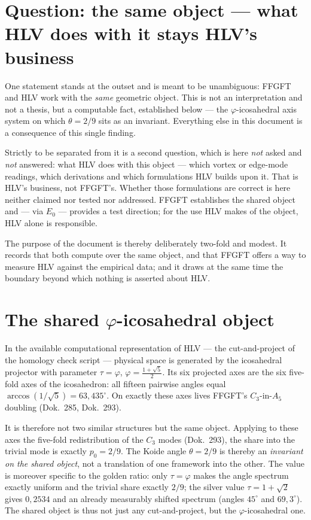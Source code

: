 \section{Question: the same object --- what HLV does with it stays HLV's business}
One statement stands at the outset and is meant to be unambiguous: FFGFT and HLV work with the
\emph{same} geometric object. This is not an interpretation and not a thesis, but a computable
fact, established below --- the $\varphi$-icosahedral axis system on which $\theta=2/9$ sits as an
invariant. Everything else in this document is a consequence of this single finding.

Strictly to be separated from it is a second question, which is here \emph{not} asked and
\emph{not} answered: what HLV does with this object --- which vortex or edge-mode readings, which
derivations and which formulations HLV builds upon it. That is HLV's business, not FFGFT's.
Whether those formulations are correct is here neither claimed nor tested nor addressed. FFGFT
establishes the shared object and --- via $E_0$ --- provides a test direction; for the use HLV
makes of the object, HLV alone is responsible.

The purpose of the document is thereby deliberately two-fold and modest. It records that both
compute over the same object, and that FFGFT offers a way to measure HLV against the empirical
data; and it draws at the same time the boundary beyond which nothing is asserted about HLV.

\section{The shared $\varphi$-icosahedral object}
In the available computational representation of HLV --- the cut-and-project of the homology
check script  --- physical space is generated by the
icosahedral projector with parameter $\tau=\varphi$, $\varphi=\tfrac{1+\sqrt5}{2}$. Its six
projected axes are the six five-fold axes of the icosahedron: all fifteen pairwise angles equal
$\arccos(1/\sqrt5)=63{,}435^\circ$. On exactly these axes lives FFGFT's $C_3$-in-$A_5$ doubling
(Dok.~285, Dok.~293).

It is therefore not two similar structures but the same object. Applying to these axes the
five-fold redistribution of the $C_3$ modes (Dok.~293), the share into the trivial mode is
exactly $p_0=2/9$. The Koide angle $\theta=2/9$ is thereby an \emph{invariant on the shared
object}, not a translation of one framework into the other. The value is moreover specific to the
golden ratio: only $\tau=\varphi$ makes the angle spectrum exactly uniform and the trivial share
exactly $2/9$; the silver value $\tau=1+\sqrt2$ gives $0{,}2534$ and an already measurably shifted
spectrum (angles $45^\circ$ and $69{,}3^\circ$). The shared object is thus not just any
cut-and-project, but the $\varphi$-icosahedral one.

